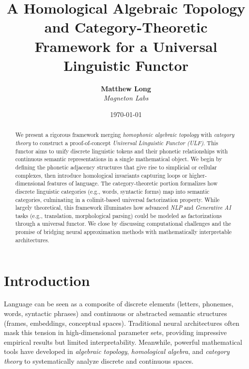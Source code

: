 \documentclass[11pt]{article}
\title{\textbf{A Homological Algebraic Topology and Category-Theoretic\\
Framework for a Universal Linguistic Functor}}
\author{
  \textbf{Matthew Long}\\
  \textit{Magneton Labs}
}
\date{\today}
\theoremstyle{definition}
\theoremstyle{remark}
\begin{document}
\maketitle

\begin{abstract}
We present a rigorous framework merging \emph{homophonic algebraic topology} with \emph{category theory} to construct a proof-of-concept \emph{Universal Linguistic Functor (ULF)}. This functor aims to unify discrete linguistic tokens and their phonetic relationships with continuous semantic representations in a single mathematical object. We begin by defining the phonetic adjacency structures that give rise to simplicial or cellular complexes, then introduce homological invariants capturing loops or higher-dimensional features of language. The category-theoretic portion formalizes how discrete linguistic categories (e.g., words, syntactic forms) map into semantic categories, culminating in a colimit-based universal factorization property. While largely theoretical, this framework illuminates how advanced \emph{NLP} and \emph{Generative AI} tasks (e.g., translation, morphological parsing) could be modeled as factorizations through a universal functor. We close by discussing computational challenges and the promise of bridging neural approximation methods with mathematically interpretable architectures.
\end{abstract}

\tableofcontents

\section{Introduction}
Language can be seen as a composite of discrete elements (letters, phonemes, words, syntactic phrases) and continuous or abstracted semantic structures (frames, embeddings, conceptual spaces). Traditional neural architectures often mask this tension in high-dimensional parameter sets, providing impressive empirical results but limited interpretability. Meanwhile, powerful mathematical tools have developed in \emph{algebraic topology}, \emph{homological algebra}, and \emph{category theory} to systematically analyze discrete and continuous spaces.
\end{document}
